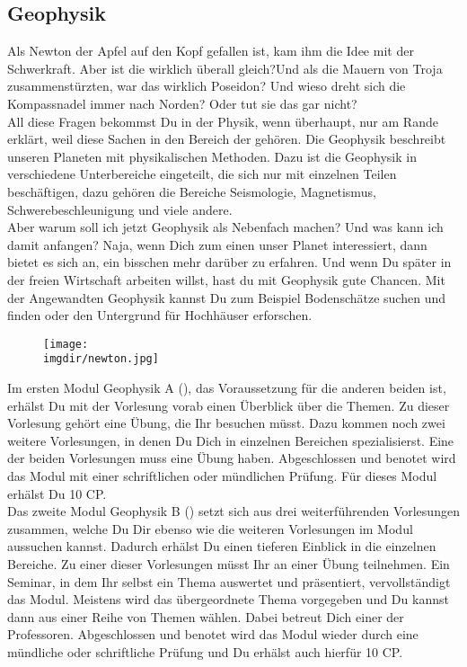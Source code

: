 \subsection{Geophysik}
\label{subsec:geophysik}
Als Newton der Apfel auf den Kopf gefallen ist, kam ihm die Idee mit der Schwerkraft. Aber ist die wirklich überall gleich?Und als die Mauern von Troja zusammenstürzten, war das wirklich Poseidon? Und wieso dreht sich die Kompassnadel immer nach Norden? Oder tut sie das gar nicht?\\
All diese Fragen bekommst Du in der Physik, wenn überhaupt, nur am Rande erklärt, weil diese Sachen in den Bereich der  gehören. Die Geophysik beschreibt unseren Planeten mit physikalischen Methoden. Dazu ist die Geophysik in verschiedene Unterbereiche eingeteilt, die sich nur mit einzelnen Teilen beschäftigen, dazu gehören die Bereiche Seismologie, Magnetismus, Schwerebeschleunigung und viele andere.\\
Aber warum soll ich jetzt Geophysik als Nebenfach machen? Und was kann ich damit anfangen? Naja, wenn Dich zum einen unser Planet interessiert, dann bietet es sich an, ein bisschen mehr darüber zu erfahren. Und wenn Du später in der freien Wirtschaft arbeiten willst, hast du mit Geophysik gute Chancen. Mit der Angewandten Geophysik kannst Du zum Beispiel Bodenschätze suchen und finden oder den Untergrund für Hochhäuser erforschen.\\
\begin{figure}[!h]
 	\centering
  	\texttt{[image: \\imgdir/newton.jpg]}
\end{figure}
Im ersten Modul Geophysik A (), das Voraussetzung für die anderen beiden ist, erhälst Du mit der Vorlesung  vorab einen Überblick über die Themen. Zu dieser Vorlesung gehört eine Übung, die Ihr besuchen müsst. Dazu kommen noch zwei weitere Vorlesungen, in denen Du Dich in einzelnen Bereichen spezialisierst. Eine der beiden Vorlesungen muss eine Übung haben. Abgeschlossen und benotet wird das Modul mit einer schriftlichen oder mündlichen Prüfung. Für dieses Modul erhälst Du 10 CP.\\
Das zweite Modul Geophysik B () setzt sich aus drei weiterführenden Vorlesungen zusammen, welche Du Dir ebenso wie die weiteren Vorlesungen im Modul  aussuchen kannst. Dadurch erhälst Du einen tieferen Einblick in die einzelnen Bereiche. Zu einer dieser Vorlesungen müsst Ihr an einer Übung teilnehmen. Ein Seminar, in dem Ihr selbst ein Thema auswertet und präsentiert, vervollständigt das Modul. Meistens wird das übergeordnete Thema vorgegeben und Du kannst dann aus einer Reihe von Themen wählen. Dabei betreut Dich einer der Professoren. Abgeschlossen und benotet wird das Modul wieder durch eine mündliche oder schriftliche Prüfung und Du erhälst auch hierfür 10 CP.\\
